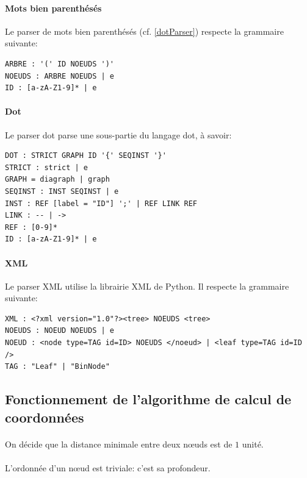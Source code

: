 \paragraph{Mots bien parenthésés}Le parser de mots bien parenthésés (cf. \ref{dotParser}) respecte la grammaire suivante:
		
\begin{verbatim}
ARBRE : '(' ID NOEUDS ')'
NOEUDS : ARBRE NOEUDS | e
ID : [a-zA-Z1-9]* | e
\end{verbatim}
		
\paragraph{Dot}Le parser dot parse une sous-partie du langage dot, à savoir:

\begin{verbatim}
DOT : STRICT GRAPH ID '{' SEQINST '}'
STRICT : strict | e
GRAPH = diagraph | graph
SEQINST : INST SEQINST | e
INST : REF [label = "ID"] ';' | REF LINK REF
LINK : -- | ->
REF : [0-9]*
ID : [a-zA-Z1-9]* | e
\end{verbatim}
		
\paragraph{XML}Le parser XML utilise la librairie XML de Python. Il respecte la grammaire suivante:
		
\begin{verbatim}
XML : <?xml version="1.0"?><tree> NOEUDS <tree>
NOEUDS : NOEUD NOEUDS | e
NOEUD : <node type=TAG id=ID> NOEUDS </noeud> | <leaf type=TAG id=ID />
TAG : "Leaf" | "BinNode"
\end{verbatim}

	\subsection{Fonctionnement de l'algorithme de calcul de coordonnées}

\paragraph{}On décide que la distance minimale entre deux n\oe uds est de $1$ unité.

\paragraph{}L'ordonnée d'un n\oe ud est triviale: c'est sa profondeur.

